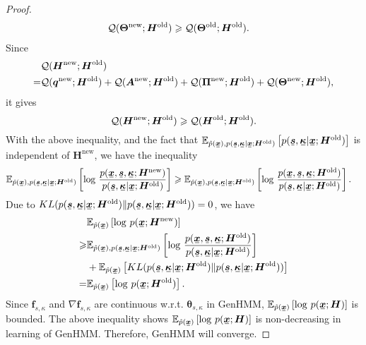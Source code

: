 \begin{proof}
\begin{align*}
    \mathcal{Q}(\bm{\Theta}^{\mathrm{new}}; \bm{H}^{\mathrm{old}}) &\geqslant \mathcal{Q}(\bm{\Theta}^{\mathrm{old}}; \bm{H}^{\mathrm{old}}).
  \end{align*}
  Since
  \begin{align*}
    &\mathcal{Q}(\bm{H}^{\mathrm{new}}; \bm{H}^{\mathrm{old}}) \nonumber \\
      = &\mathcal{Q}(\bm{q}^{\mathrm{new}}; \bm{H}^{\mathrm{old}}) + \mathcal{Q}(\bm{A}^{\mathrm{new}}; \bm{H}^{\mathrm{old}}) + \mathcal{Q}(\bm{\Pi}^{\mathrm{new}}; \bm{H}^{\mathrm{old}})
                                                          + \mathcal{Q}(\bm{\Theta}^{\mathrm{new}}; \bm{H}^{\mathrm{old}}),
  \end{align*}
  it gives
  \begin{equation*}
    \mathcal{Q}(\bm{H}^{\mathrm{new}}; \bm{H}^{\mathrm{old}}) \geqslant \mathcal{Q}(\bm{H}^{\mathrm{old}}; \bm{H}^{\mathrm{old}}).
  \end{equation*}
  With the above inequality, and the fact that $\EE_{\hat{p}(\ubm{x}),p(\ubm{s},\ubm{\kappa}| \ubm{x}; \bm{H}^{\mathrm{old}})}\left[p(\ubm{s}, \ubm{\kappa}|\ubm{x}; \bm{H}^{\mathrm{old}})\right]$ is independent of $\bm{H}^{\mathrm{new}}$, we have the inequality 
  \begin{align*}
    &\EE_{\hat{p}(\ubm{x}),p(\ubm{s},\ubm{\kappa}| \ubm{x}; \bm{H}^{\mathrm{old}})}\left[ \log\,\frac{p(\ubm{x}, \ubm{s}, \ubm{\kappa}; \bm{H}^{\mathrm{new}})}{p(\ubm{s}, \ubm{\kappa}|\ubm{x}; \bm{H}^{\mathrm{old}})}\right] 
    \geq \EE_{\hat{p}(\ubm{x}),p(\ubm{s},\ubm{\kappa}| \ubm{x}; \bm{H}^{\mathrm{old}})}\left[ \log\,\frac{p(\ubm{x}, \ubm{s}, \ubm{\kappa}; \bm{H}^{\mathrm{old}})}{p(\ubm{s}, \ubm{\kappa}|\ubm{x}; \bm{H}^{\mathrm{old}})}\right].
  \end{align*}
  Due to $KL(p(\ubm{s}, \ubm{\kappa}|\ubm{x};
  \bm{H}^{\mathrm{old}})\|p(\ubm{s}, \ubm{\kappa}|\ubm{x};
  \bm{H}^{\mathrm{old}}))=0$, we have
  \begin{align*}
    &\EE_{\hat{p}(\ubm{x})}\left[ \log\,p(\ubm{x};\bm{H}^{\mathrm{new}}) \right] \nonumber \\
    \geq & \EE_{\hat{p}(\ubm{x}),p(\ubm{s},\ubm{\kappa}| \ubm{x};
           \bm{H}^{\mathrm{old}})}\left[ \log\,\frac{p(\ubm{x},
           \ubm{s}, \ubm{\kappa}; \bm{H}^{\mathrm{old}})}{p(\ubm{s},
           \ubm{\kappa}|\ubm{x}; \bm{H}^{\mathrm{old}})}\right] \nonumber \\
           &+ \EE_{\hat{p}(\ubm{x})}\left[ KL(p(\ubm{s}, \ubm{\kappa}|\ubm{x}; \bm{H}^{\mathrm{old}})\|p(\ubm{s}, \ubm{\kappa}|\ubm{x}; \bm{H}^{\mathrm{old}})) \right]
      \nonumber \\
    = & \EE_{\hat{p}(\ubm{x})}\left[ \log\,p(\ubm{x};\bm{H}^{\mathrm{old}}) \right].
  \end{align*}
  Since $\bm{f}_{s,\kappa}$ and  ${\nabla\bm{f}_{s,\kappa}}$ are continuous w.r.t. ${\bm\theta}_{s,\kappa}$ in GenHMM, $\EE_{\hat{p}(\ubm{x})}\left[ \log\,p(\ubm{x};\bm{H}) \right]$ is bounded. The above inequality shows $\EE_{\hat{p}(\ubm{x})}\left[ \log\,p(\ubm{x};\bm{H}) \right]$ is non-decreasing in learning of GenHMM. Therefore, GenHMM will converge.
  

\end{proof}

